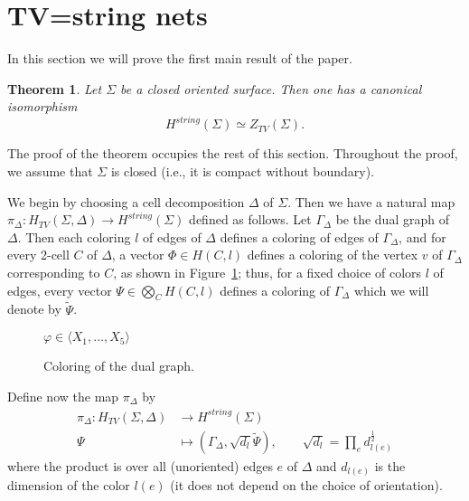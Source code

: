 \documentclass{amsart}
\newtheorem{theorem}{Theorem}[section]
\theoremstyle{definition}
\theoremstyle{remark}
\numberwithin{equation}{section}
\newcommand{\firef}[1]{Figure~{\rm\ref{#1}}}
\newcommand{\<}{\langle}
\renewcommand{\>}{\rangle}
\renewcommand{\i}{{\mathrm{i}}}   %
\newcommand{\Ga}{\Gamma}
\newcommand{\De}{\Delta}
\newcommand{\ph}{\varphi}
\newcommand{\Ph}{\Phi}
\newcommand{\Si}{\Sigma}
\newcommand{\Hs}{H^{string}}
\newcommand{\HTV}{H_{TV}}
\newcommand{\ZTV}{Z_{TV}}
\begin{document}
\section{TV=string nets}\label{s:main}
In this section we will prove the first main result of the paper.
\begin{theorem}\label{t:main}
  Let $\Si$ be a closed oriented surface. Then one has a canonical
  isomorphism
  $$
    \Hs(\Si)\simeq\ZTV(\Si).
  $$
\end{theorem}

The proof of the theorem occupies the rest of this section. Throughout the
proof, we assume that $\Si$ is closed (i.e., it is compact without
boundary). 

We begin by choosing a cell decomposition $\De$ of $\Si$. Then we have a
natural map $\pi_\De\colon \HTV(\Si, \De)\to \Hs(\Si)$
defined as follows. Let $\Ga_\De$ be the dual graph of $\De$. Then each 
coloring $l$ of edges of $\De$ defines a coloring of edges of $\Ga_\De$, and 
for every 2-cell $C$ of $\De$,  a vector $\Ph\in H(C,l)$ defines a coloring 
of the vertex $v$ of $\Ga_\De$ corresponding to $C$, as shown in 
\firef{f:dual_graph}; thus, for a fixed choice of colors $l$ of edges, 
every vector  $\Psi\in \bigotimes_{C}H(C,l)$ defines a 
coloring of $\Ga_\De$ which we will  denote by  $\tilde \Psi$. 



\begin{figure}[ht]
\qquad 
$\ph\in \<X_1,\dots, X_5\>$
\caption{Coloring of the dual graph.}\label{f:dual_graph}
\end{figure}

 
 Define now the map $\pi_\De$ by 
 \begin{equation}\label{e:TVtoHS}
\begin{aligned}
\pi_\De\colon \HTV(\Si, \De)&\to \Hs(\Si)\\
           \Psi&\mapsto (\Ga_\De, \sqrt{d_l} \tilde \Psi), \qquad 
             \sqrt{d_l}=\prod_{e} d_{l(e)}^{\tfrac{1}{2}}
\end{aligned}
\end{equation}
where the product is over all (unoriented)  edges $e$ of $\De$ and
$d_{l(e)}$ is the dimension of the color $l(e)$ (it does not depend on the
choice of orientation).   
\end{document}
